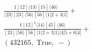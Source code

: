 \documentclass[varwidth, border=5pt]{standalone}
\begin{document}
\begin{my}
$\begin{gathered}
\scriptscriptstyle\frac{1[12]⟨13⟩[15]⟨46⟩}{⟨23⟩[23]⟨56⟩[56]⟨1|2+3|1]}+\\
\scriptscriptstyle\frac{1[12]^2⟨14⟩[45]⟨46⟩}{[23]⟨56⟩[56]⟨1|2+3|1]⟨4|5+6|4]}+\\
\scriptscriptstyle(432165,\;\text{True},\;-)\phantom{+}
\end{gathered}$
\end{my}
\end{document}
